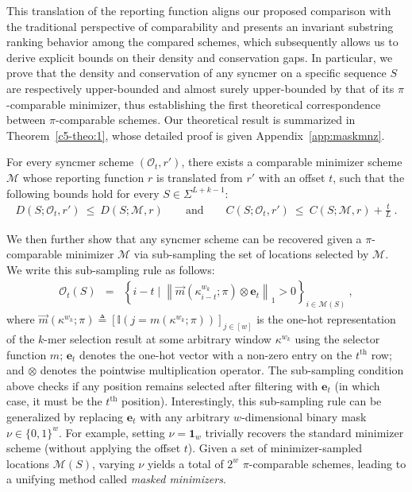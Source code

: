 This translation of the reporting function aligns our proposed comparison with the traditional perspective of comparability and presents an invariant substring ranking behavior among the compared schemes, which subsequently allows us to derive explicit bounds on their density and conservation gaps. In particular, we prove that the density and conservation of any syncmer on a specific sequence $S$ are respectively upper-bounded and almost surely upper-bounded by that of its $\pi$-comparable minimizer, thus establishing the first theoretical correspondence between $\pi$-comparable schemes. Our theoretical result is summarized in Theorem~\ref{c5-theo:1}, whose detailed proof is given Appendix~\ref{app:maskmnz}.
\begin{theorem} For \linebreak every syncmer scheme  $(\mathcal{O}_t, r')$, there exists a comparable minimizer scheme $\mathcal{M}$ whose reporting function $r$ is translated from $r'$ with an offset $t$, such that the following bounds hold for every $S \in \Sigma^{L+k-1}$: 
\begin{eqnarray}
D(S; \mathcal{O}_t,r') \ \leq 
 \ D(S; \mathcal{M},r) \qquad \text{and} \qquad  C(S; \mathcal{O}_t,r') \ \leq \ C(S; \mathcal{M},r) + \frac{t}{L} \ .
\end{eqnarray}
\label{c5-theo:1}
\end{theorem}
We then further show that any syncmer scheme can be recovered given a $\pi$-comparable minimizer $\mathcal{M}$ via sub-sampling the set of locations selected by $\mathcal{M}$. We write this sub-sampling rule as follows:
\begin{eqnarray}
\mathcal{O}_t(S) &=& \left\{
i - t \mid \left\|    \overrightarrow{m}(\kappa^{w_k}_{i-t};\pi) \otimes \mathbf{e}_t
\right\|_1 > 0
\right\}_{i \in \mathcal{M}(S)} \ ,
\end{eqnarray}
where $\overrightarrow{m}(\kappa^{w_k};\pi) \triangleq [\mathbb{I}(j=m(\kappa^{w_k}; \pi))]_{j\in[w]}$ is the one-hot representation of the $k$-mer selection result at some arbitrary window $\kappa^{w_k}$ using the selector function $m$; $\mathbf{e}_t$ denotes the one-hot vector with a non-zero entry on the $t^{\text{th}}$ row; and $\otimes$ denotes the pointwise multiplication operator. The sub-sampling condition above checks if any position remains selected after filtering with $\mathbf{e}_t$ (in which case, it must be the $t^{\text{th}}$ position). Interestingly, this sub-sampling rule can be generalized by replacing $\mathbf{e}_t$ with any arbitrary $w$-dimensional binary mask $\nu \in \{0,1\}^w$. For example, setting $\nu=\mathbf{1}_w$ trivially recovers the standard minimizer scheme (without applying the offset $t$). Given a set of minimizer-sampled locations $\mathcal{M}(S)$,  varying $\nu$ yields a total of $2^w$ $\pi$-comparable schemes, leading to a unifying method called \textit{masked minimizers}. 
